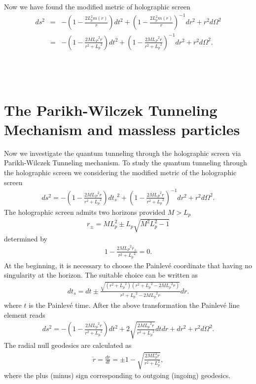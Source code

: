 \documentclass[12pt]{article}
\begin{document}
Now we have found the modified metric of holographic screen
\begin{eqnarray}
ds^2 &=& -\left(1- \frac{2L_p^2 m(r)}{r}\right) dt^2  + \left(1- \frac{2L_p^2 m(r)}{r}   \right)^{-1} dr^2 +r^2 d\Omega^2   \nonumber \\
&=& -\left( 1- \frac{2M {L_P}^2 r}{r^2+{L_p}^2} \right)dt^2 + \left( 1- \frac{2M {L_P}^2 r}{r^2+{L_p}^2} \right)^{-1}d{r^2} +r^2 d\Omega^2.
\end{eqnarray}
\\
\\
\\
\section{The Parikh-Wilczek Tunneling Mechanism and massless particles}
Now we investigate the quantum tunneling through the holographic screen via Parikh-Wilczek Tunneling mechanism.
To study the quantum tunneling through the holographic screen we considering the modified metric of the holographic screen
\begin{eqnarray}
ds^2 = -\left( 1- \frac{2M {L_P}^2 r}{r^2+{L_p}^2} \right)d{t_s}^2 + \left( 1- \frac{2M {L_P}^2 r}{r^2+{L_p}^2} \right)^{-1}d{r^2} +r^2 d\Omega^2.
\end{eqnarray}
The holographic screen admits two horizons provided $M > L_p$
\begin{eqnarray}
r_{\pm} = M L_p^2 \pm L_p \sqrt{M^2 L_p^2 -1}
\end{eqnarray}
 determined by
\begin{eqnarray}
1- \frac{2M {L_P}^2 r_{\pm}}{r^2+{L_p}^2} =0.
\end{eqnarray}
At the beginning, it is necessary to choose the Painlev\'{e} coordinate that having no singularity at the horizon.
The suitable choice can be written as \cite{PAINLEVE}
\begin{eqnarray}
dt_s = dt \pm \frac{\sqrt{(r^2+{L_p}^2)(r^2+{L_p}^2-2 M {L_p}^2 r)}}{r^2+{L_p}^2-2 M {L_p}^2 r}dr.
\end{eqnarray}
where $t$ is the  Painlev\'{e} time. After the above transformation the  Painlev\'{e} line element reads
\begin{eqnarray}
ds^2 = - \left(1 - \frac{2 M {L_p}^2 r}{r^2+{L_p}^2} \right) dt^2 + 2 \sqrt{\frac{2 M {L_p}^2 r}{r^2+{L_p}^2}}dtdr + dr^2 +r^2 d\Omega^2.
\end{eqnarray}
The radial null geodesics are calculated as
\begin{eqnarray}
\dot{r} = \frac{dr}{dt}= \pm 1 - \sqrt{ \frac{2 M L_p^2 r}{r^2+L_p^2} },
\end{eqnarray}
where the plus (minus) sign corresponding to outgoing (ingoing) geodesics.
\end{document}
